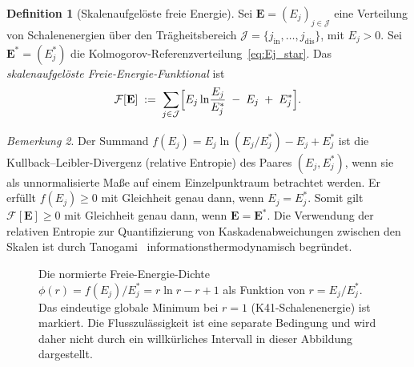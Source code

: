 \documentclass[12pt,a4paper]{article}
\theoremstyle{definition}
\newtheorem{definition}{Definition}[section]
\theoremstyle{plain}
\theoremstyle{remark}
\newtheorem{remark}[definition]{Bemerkung}
\begin{document}
\begin{definition}[Skalenaufgelöste freie Energie]\label{def:F}
Sei $\mathbf{E} = (E_j)_{j \in \mathcal{J}}$ eine Verteilung von Schalenenergien
über den Trägheitsbereich $\mathcal{J} = \{j_{\mathrm{in}}, \dots,
j_{\mathrm{dis}}\}$, mit $E_j > 0$. Sei $\mathbf{E}^* = (E_j^*)$ die
Kolmogorov-Referenzverteilung~\eqref{eq:Ej_star}. Das
\emph{skalenaufgelöste Freie-Energie-Funktional} ist
\begin{equation}\label{eq:F}
  \mathcal{F}[\mathbf{E}]
  \;:=\;
  \sum_{j \in \mathcal{J}}
  \Bigl[
    E_j \ln\!\frac{E_j}{E_j^*} \;-\; E_j \;+\; E_j^*
  \Bigr].
\end{equation}
\end{definition}

\begin{remark}
Der Summand $f(E_j) = E_j \ln(E_j/E_j^*) - E_j + E_j^*$ ist die
Kullback--Leibler-Divergenz (relative Entropie) des Paares $(E_j, E_j^*)$,
wenn sie als unnormalisierte Maße auf einem Einzelpunktraum betrachtet werden. Er erfüllt
$f(E_j) \ge 0$ mit Gleichheit genau dann, wenn $E_j = E_j^*$. Somit
gilt $\mathcal{F}[\mathbf{E}] \ge 0$ mit Gleichheit genau dann, wenn $\mathbf{E}
= \mathbf{E}^*$. Die Verwendung der relativen Entropie zur Quantifizierung von Kaskadenabweichungen zwischen den Skalen ist durch Tanogami~\cite{Tanogami2023,Tanogami2025} informationsthermodynamisch begründet.
\end{remark}

\begin{figure}[ht]
\centering
{}
\caption{Die normierte Freie-Energie-Dichte
$\phi(r)=f(E_j)/E_j^*=r\ln r-r+1$ als Funktion von
$r=E_j/E_j^*$. Das eindeutige globale Minimum bei $r=1$ (K41-Schalenenergie)
ist markiert. Die Flusszulässigkeit ist eine separate Bedingung und wird
daher nicht durch ein willkürliches Intervall in dieser Abbildung dargestellt.}
\label{fig:FE-landscape}
\end{figure}
\end{document}
